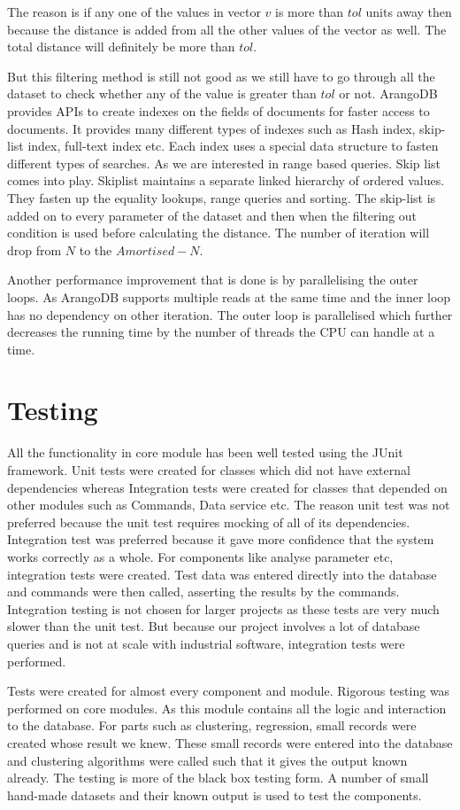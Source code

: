 The reason is if any one of the values in vector \(v\) is more than \(tol\) units away then because the distance is added from all the other values of the vector as well. The total distance will definitely be more than \(tol\).

But this filtering method is still not good as we still have to go through all the dataset to check whether any of the value is greater than \(tol\) or not. ArangoDB provides APIs to create indexes on the fields of documents for faster access to documents. It provides many different types of indexes such as Hash index, skip-list index, full-text index etc. Each index uses a special data structure to fasten different types of searches. As we are interested in range based queries. Skip list comes into play. Skiplist maintains a separate linked hierarchy of ordered values. They fasten up the equality lookups, range queries and sorting. The skip-list is added on to every parameter of the dataset and then when the filtering out condition is used before calculating the distance. The number of iteration will drop from \(N\) to the \(Amortised-N\).

Another performance improvement that is done is by parallelising the outer loops. As ArangoDB supports multiple reads at the same time and the inner loop has no dependency on other iteration. The outer loop is parallelised which further decreases the running time by the number of threads the CPU can handle at a time. 

\section{Testing}

All the functionality in core module has been well tested using the JUnit framework. Unit tests were created for classes which did not have external dependencies whereas Integration tests were created for classes that depended on other modules such as Commands, Data service etc. The reason unit test was not preferred because the unit test requires mocking of all of its dependencies. Integration test was preferred because it gave more confidence that the system works correctly as a whole. For components like analyse parameter etc, integration tests were created. Test data was entered directly into the database and commands were then called, asserting the results by the commands. Integration testing is not chosen for larger projects as these tests are very much slower than the unit test. But because our project involves a lot of database queries and is not at scale with industrial software, integration tests were performed. 

Tests were created for almost every component and module. Rigorous testing was performed on core modules. As this module contains all the logic and interaction to the database. For parts such as clustering, regression, small records were created whose result we knew. These small records were entered into the database and clustering algorithms were called such that it gives the output known already. The testing is more of the black box testing form. A number of small hand-made datasets and their known output is used to test the components.
